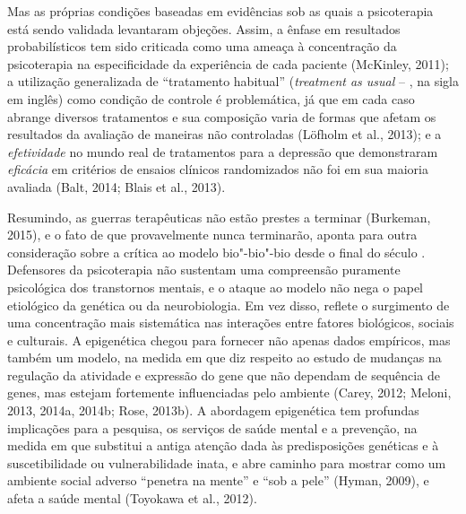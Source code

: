 Mas as próprias condições baseadas em evidências sob as quais a
psicoterapia está sendo validada levantaram objeções. Assim, a ênfase em
resultados probabilísticos tem sido criticada como uma ameaça à
concentração da psicoterapia na especificidade da experiência de cada
paciente (McKinley, 2011); a utilização generalizada de ``tratamento
habitual'' (\emph{treatment as usual} -- , na sigla em inglês) como
condição de controle é problemática, já que em cada caso  abrange
diversos tratamentos e sua composição varia de formas que afetam os
resultados da avaliação de maneiras não controladas (Löfholm et al.,
2013); e a \emph{efetividade} no mundo real de tratamentos para a
depressão que demonstraram \emph{eficácia} em critérios de ensaios
clínicos randomizados não foi em sua maioria avaliada (Balt, 2014; Blais
et al., 2013).

Resumindo, as guerras terapêuticas não estão prestes a terminar
(Burkeman, 2015), e o fato de que provavelmente nunca terminarão, aponta
para outra consideração sobre a crítica ao modelo bio"-bio"-bio desde o
final do século . Defensores da psicoterapia não sustentam uma
compreensão puramente psicológica dos transtornos mentais, e o ataque ao
modelo não nega o papel etiológico da genética ou da neurobiologia. Em
vez disso, reflete o surgimento de uma concentração mais sistemática nas
interações entre fatores biológicos, sociais e culturais. A epigenética
chegou para fornecer não apenas dados empíricos, mas também um modelo,
na medida em que diz respeito ao estudo de mudanças na regulação da
atividade e expressão do gene que não dependam de sequência de genes,
mas estejam fortemente influenciadas pelo ambiente (Carey, 2012; Meloni,
2013, 2014a, 2014b; Rose, 2013b). A abordagem epigenética tem profundas
implicações para a pesquisa, os serviços de saúde mental e a prevenção,
na medida em que substitui a antiga atenção dada às predisposições
genéticas e à suscetibilidade ou vulnerabilidade inata, e abre caminho
para mostrar como um ambiente social adverso ``penetra na mente'' e
``sob a pele'' (Hyman, 2009), e afeta a saúde mental (Toyokawa et al.,
2012).

